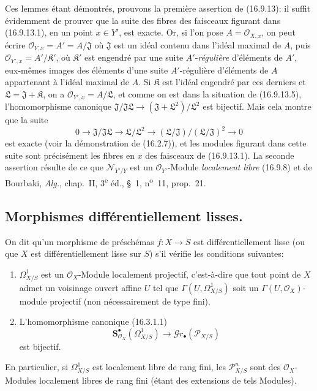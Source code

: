 Ces lemmes étant démontrés, prouvons la première assertion de (16.9.13): il
suffit
évidemment de prouver que la suite des fibres des faisceaux figurant dans
(16.9.13.1), en un point $x\in Y'$, est exacte. Or, si l'on pose
$A=\mathcal{O}_{X,x}$, on peut écrire
$\mathcal{O}_{Y,x}=A'=A/\mathfrak{J}$ où $\mathfrak{J}$ est un idéal contenu
dans l'idéal maximal de $A$, puis
$\mathcal{O}_{Y',x}=A'/\mathfrak{K}'$, où $\mathfrak{K}'$ est engendré par une
suite $A'$-\emph{régulière} d'éléments de $A'$, eux-mêmes images des éléments d'une
suite $A'$-régulière d'éléments de $A$ appartenant à l'idéal maximal de $A$.
Si $\mathfrak{K}$ est l'idéal engendré par ces derniers et
$\mathfrak{L}=\mathfrak{J}+\mathfrak{K}$, on a
$\mathcal{O}_{Y',x}=A/\mathfrak{L}$, et comme on est dans la situation de
(16.9.13.5), l'homomorphisme canonique
$\mathfrak{J}/\mathfrak{J}\mathfrak{L}\to(\mathfrak{J}+\mathfrak{L}^2)/\mathfrak{L}^2$ est bijectif. Mais cela montre que la suite
\[
  0\longrightarrow\mathfrak{J}/\mathfrak{J}\mathfrak{L}
  \longrightarrow\mathfrak{L}/\mathfrak{L}^2
  \longrightarrow(\mathfrak{L}/\mathfrak{J})/
    (\mathfrak{L}/\mathfrak{J})^2\longrightarrow0
\]
est exacte (voir la démonstration de (16.2.7)), et les modules figurant dans
cette suite sont précisément les fibres en $x$ des faisceaux de (16.9.13.1).
La seconde assertion résulte de ce que $\mathcal{N}_{Y'/Y}$ est un
$\mathcal{O}_{Y'}$-Module \emph{localement libre} (16.9.8) et de Bourbaki,
\emph{Alg.}, chap.~II, 3\textsuperscript{e} éd., §~1, n\textsuperscript{o}~11,
prop.~21.

\subsection{Morphismes différentiellement lisses.}

\begin{definition}[16.10.1]
On dit qu'un morphisme de préschémas $f:X\to S$ est
différentiellement lisse (ou que $X$ est différentiellement
lisse sur $S$) s'il vérifie les conditions suivantes:
\begin{enumerate}
  \item[\textup{(i)}] $\varOmega_{X/S}^1$ est un $\mathcal{O}_X$-Module localement
  projectif, c'est-à-dire que tout point de $X$ admet un voisinage ouvert
  affine $U$ tel que $\Gamma(U,\varOmega_{X/S}^1)$ soit un
  $\Gamma(U,\mathcal{O}_X)$-module projectif (non nécessairement de type
  fini).
  \item[\textup{(ii)}] L'homomorphisme canonique \textup{(16.3.1.1)}
  \[
    \mathbf{S}_{\mathcal{O}_X}^{\bullet}(\varOmega_{X/S}^1)
    \longrightarrow\mathscr{G}r_{\bullet}(\mathscr{P}_{X/S})
  \]
  est bijectif.
\end{enumerate}

En particulier, si $\varOmega_{X/S}^1$ est localement libre de rang fini, les
$\mathscr{P}_{X/S}^n$ sont des $\mathcal{O}_X$-Modules localement libres de
rang fini \textup{(étant des extensions de tels Modules)}.
\end{definition}

